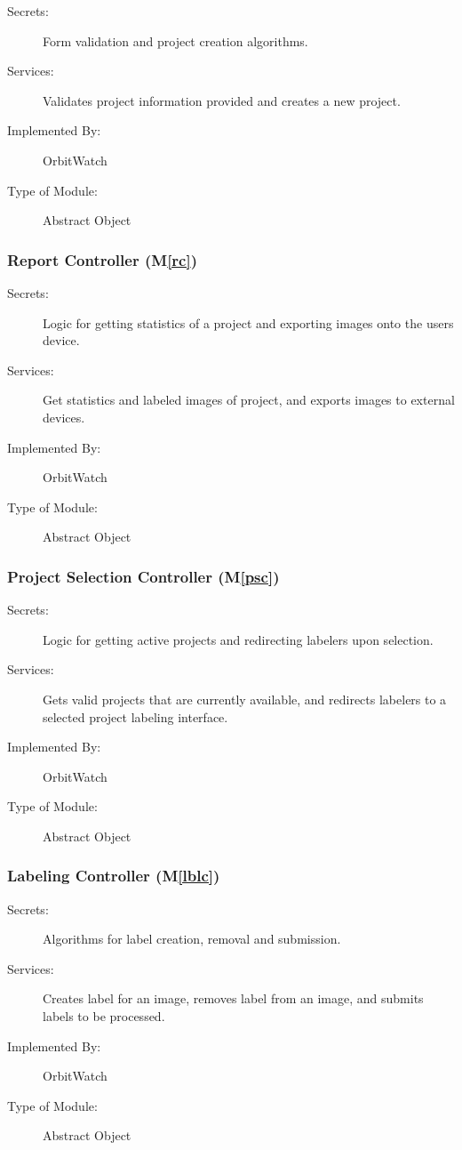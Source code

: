 \documentclass[12pt, titlepage]{article}
\newcommand{\mref}[1]{M\ref{#1}}
\begin{document}
\begin{description}
\item[Secrets:] Form validation and project creation algorithms.
\item[Services:] Validates project information provided and creates a new project.
\item[Implemented By:] OrbitWatch
\item[Type of Module:] Abstract Object
\end{description}

\subsubsection{Report Controller (\mref{rc})}

\begin{description}
\item[Secrets:] Logic for getting statistics of a project and exporting images onto the users device.
\item[Services:] Get statistics and labeled images of project, and exports images to external devices.
\item[Implemented By:] OrbitWatch
\item[Type of Module:] Abstract Object
\end{description}

\subsubsection{Project Selection Controller (\mref{psc})}

\begin{description}
\item[Secrets:] Logic for getting active projects and redirecting labelers upon selection.
\item[Services:] Gets valid projects that are currently available, and redirects labelers to a selected project labeling interface.
\item[Implemented By:] OrbitWatch
\item[Type of Module:] Abstract Object
\end{description}

\subsubsection{Labeling Controller (\mref{lblc})}

\begin{description}
\item[Secrets:] Algorithms for label creation, removal and submission.
\item[Services:] Creates label for an image, removes label from an image, and submits labels to be processed.
\item[Implemented By:] OrbitWatch
\item[Type of Module:] Abstract Object
\end{description}
\end{document}
